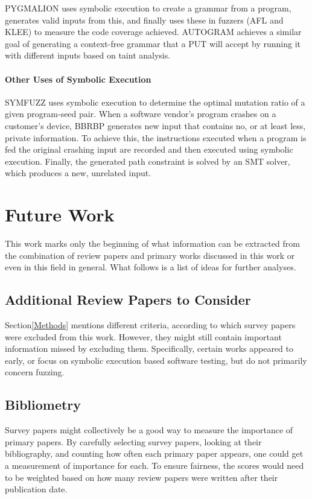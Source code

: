 \documentclass{article}
\begin{document}
\begin{multicols}{2}
    PYGMALION\cite{PYGMALION} uses symbolic execution to create a grammar from a program, generates valid inputs from this, and finally uses these in fuzzers (AFL\cite{AFLPlusPlus} and KLEE\cite{KLEE}) to measure the code coverage achieved. AUTOGRAM\cite{AUTOGRAM} achieves a similar goal of generating a context-free grammar that a PUT will accept by running it with different inputs based on taint analysis.

    \paragraph{Other Uses of Symbolic Execution} SYMFUZZ\cite{SYMFUZZ} uses symbolic execution to determine the optimal mutation ratio of a given program-seed pair. When a software vendor's program crashes on a customer's device, BBRBP\cite{BBRBP} generates new input that contains no, or at least less, private information. To achieve this, the instructions executed when a program is fed the original crashing input are recorded and then executed using symbolic execution. Finally, the generated path constraint is solved by an SMT solver, which produces a new, unrelated input.

    \section{Future Work}
    \label{FutureWork}
    This work marks only the beginning of what information can be extracted from the combination of review papers and primary works discussed in this work or even in this field in general. What follows is a list of ideas for further analyses.

    \subsection{Additional Review Papers to Consider}
    Section\ref{Methods} mentions different criteria, according to which survey papers were excluded from this work. However, they might still contain important information missed by excluding them. Specifically, certain works appeared to early\cite{AutomaticTestDataGeneration, BruteForceVulnDiscovery,BreakingSoftware}, or focus on symbolic execution based software testing, but do not primarily concern fuzzing\cite{DSETestGeneration, SurveySymbex, SearchStrategies, NewTrendsSymbex, ReviewConcolicTesting}.

    \subsection{Bibliometry}
    Survey papers might collectively be a good way to measure the importance of primary papers. By carefully selecting survey papers, looking at their bibliography, and counting how often each primary paper appears, one could get a measurement of importance for each. To ensure fairness, the scores would need to be weighted based on how many review papers were written after their publication date.


\end{multicols}
\end{document}
